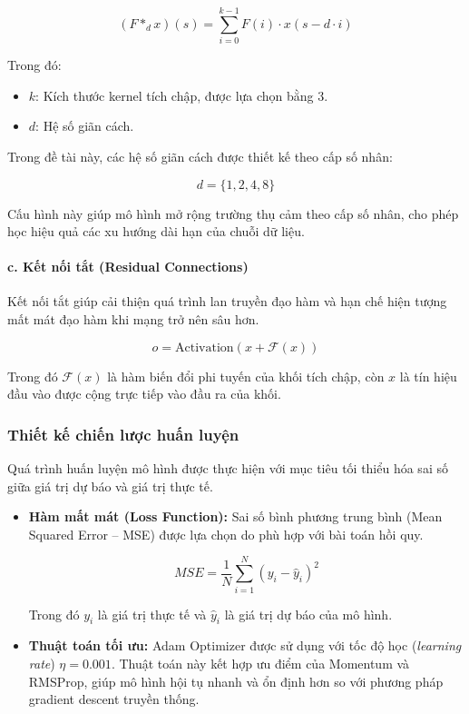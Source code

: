 \[
(F *_d x)(s) = \sum_{i=0}^{k-1} F(i) \cdot x(s - d \cdot i)
\]

Trong đó:

\begin{itemize}
    \item $k$: Kích thước kernel tích chập, được lựa chọn bằng 3.
    \item $d$: Hệ số giãn cách.
\end{itemize}

Trong đề tài này, các hệ số giãn cách được thiết kế theo cấp số nhân:

\[
d = \{1, 2, 4, 8\}
\]

Cấu hình này giúp mô hình mở rộng trường thụ cảm theo cấp số nhân, cho phép học hiệu quả các xu hướng dài hạn của chuỗi dữ liệu.

\paragraph{c. Kết nối tắt (Residual Connections)}

Kết nối tắt giúp cải thiện quá trình lan truyền đạo hàm và hạn chế hiện tượng mất mát đạo hàm khi mạng trở nên sâu hơn.

\[
o = \text{Activation}(x + \mathcal{F}(x))
\]

Trong đó $\mathcal{F}(x)$ là hàm biến đổi phi tuyến của khối tích chập, còn $x$ là tín hiệu đầu vào được cộng trực tiếp vào đầu ra của khối.

\subsubsection{Thiết kế chiến lược huấn luyện}

Quá trình huấn luyện mô hình được thực hiện với mục tiêu tối thiểu hóa sai số giữa giá trị dự báo và giá trị thực tế.

\begin{itemize}
    \item \textbf{Hàm mất mát (Loss Function):}  
    Sai số bình phương trung bình (Mean Squared Error -- MSE) được lựa chọn do phù hợp với bài toán hồi quy.

    \[
    MSE = \frac{1}{N}\sum_{i=1}^{N}(y_i - \hat{y}_i)^2
    \]

    Trong đó $y_i$ là giá trị thực tế và $\hat{y}_i$ là giá trị dự báo của mô hình.

    \item \textbf{Thuật toán tối ưu:}  
    Adam Optimizer được sử dụng với tốc độ học (\textit{learning rate}) $\eta = 0.001$. Thuật toán này kết hợp ưu điểm của Momentum và RMSProp, giúp mô hình hội tụ nhanh và ổn định hơn so với phương pháp gradient descent truyền thống.
\end{itemize}

